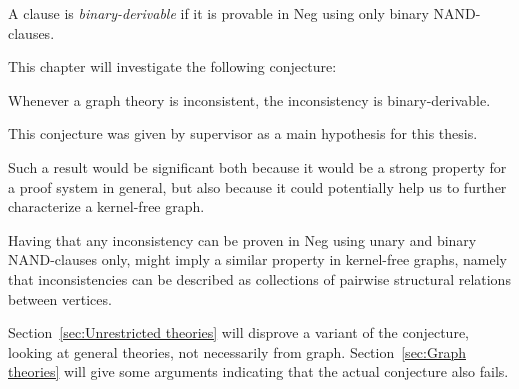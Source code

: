 

\begin{definition}
  A clause is \textit{binary-derivable} if it is provable in Neg using only binary NAND-clauses.
\end{definition}
This chapter will investigate the following conjecture:
\begin{conjecture}
  Whenever a graph theory is inconsistent, the inconsistency is binary-derivable.
\end{conjecture}
This conjecture was given by supervisor as a main hypothesis for this thesis.

Such a result would be significant both because it would be a strong property for a proof system in general, but also because it could potentially help us to further characterize a kernel-free graph.

Having that any inconsistency can be proven in Neg using unary and binary NAND-clauses only, might imply a similar property in kernel-free graphs, namely that inconsistencies can be described as collections of pairwise structural relations between vertices.

Section~\ref{sec:Unrestricted theories} will disprove a variant of the conjecture, looking at general theories, not necessarily from graph.
Section~\ref{sec:Graph theories} will give some arguments indicating that the actual conjecture also fails.
